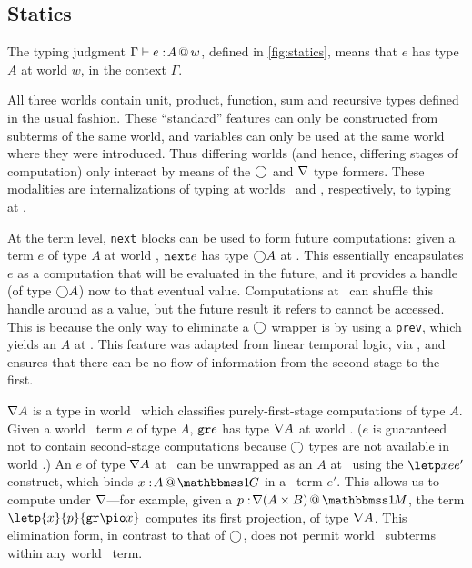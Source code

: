 \subsection{Statics}
\label{sec:statics}



\begin{abstrsyn}

The typing judgment $\Gamma{} \vdash {e}:\!{A}~\hspace{-0.2em}\textsc{\textrm{@}}\hspace{-0.2em}~w$, defined in \ref{fig:statics}, means that
$e$ has type $A$ at world $w$, in the context $\Gamma$. 

All three worlds contain unit, product, function, sum and recursive types defined in the usual fashion.
These ``standard'' features can only be constructed from subterms of the same world,
and variables can only be used at the same world where they were introduced.
Thus differing worlds (and hence, differing stages of computation) only interact by means
of the $\bigcirc$ and $\nabla$ type formers.  These modalities are internalizations
of typing at worlds \bbtwo\ and \bbonep, respectively, to typing at \bbonem.

At the term level, {\tt next} blocks can be used to form future computations:
given a term $e$ of type $A$ at world \bbtwo, ${\tt next}{e}$ has type $\bigcirc A$ at \bbonem. 
This essentially encapsulates $e$ as a computation that will be evaluated in the future, 
and it provides a handle (of type $\bigcirc A$) now to that eventual value.
Computations at \bbonem\ can shuffle this handle around as a value, but the future result it refers to cannot be accessed.
This is because the only way to eliminate a $\bigcirc$ wrapper is by using a {\tt prev}, which yields an $A$ at \bbtwo.
This feature was adapted from linear temporal logic, via \cite{davies96},
and ensures that there can be no flow of information from the second stage to the first.

$\nabla A$ is a type in world \bbonem\ which classifies purely-first-stage
computations of type $A$. Given a world \bbonep\ term $e$ of type $A$,
${\tt gr}{e}$ has type $\nabla A$ at world \bbonem. ($e$ is guaranteed not to contain
second-stage computations because $\bigcirc$ types are not available in world
\bbonep.)
An $e$ of type $\nabla A$ at \bbonem\ can be unwrapped as an $A$ at \bbonep\
using the $\letp xe{e'}$ construct, which binds $\colpure xA$ in a \bbonem\ term
$e'$. This allows us to compute under $\nabla$---for example, given a $\colmix
p{\curr(A\times B)}$, the term $\letp{x}{p}{\pure{\pio x}}$ computes its first
projection, of type $\nabla A$.
This elimination form, in contrast to that of $\bigcirc$, does not permit world \bbonem\ subterms
within any world \bbonep\ term.


\end{abstrsyn}
